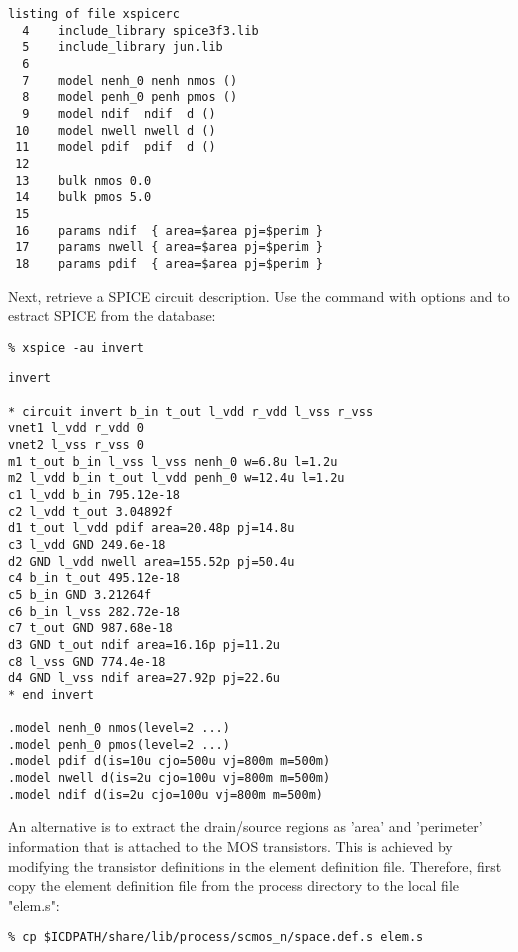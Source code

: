 \small \begin{Verbatim}[frame=single]
listing of file xspicerc
  4    include_library spice3f3.lib
  5    include_library jun.lib
  6
  7    model nenh_0 nenh nmos ()
  8    model penh_0 penh pmos ()
  9    model ndif  ndif  d ()
 10    model nwell nwell d ()
 11    model pdif  pdif  d ()
 12
 13    bulk nmos 0.0
 14    bulk pmos 5.0
 15
 16    params ndif  { area=$area pj=$perim }
 17    params nwell { area=$area pj=$perim }
 18    params pdif  { area=$area pj=$perim }
\end{Verbatim}
\normalsize
Next, retrieve a SPICE circuit description.
Use the  command with options  and  to estract SPICE from the database:
\small
\begin{Verbatim}
% xspice -au invert
\end{Verbatim}
\normalsize
\small \begin{Verbatim}[frame=single]
invert

* circuit invert b_in t_out l_vdd r_vdd l_vss r_vss
vnet1 l_vdd r_vdd 0
vnet2 l_vss r_vss 0
m1 t_out b_in l_vss l_vss nenh_0 w=6.8u l=1.2u
m2 l_vdd b_in t_out l_vdd penh_0 w=12.4u l=1.2u
c1 l_vdd b_in 795.12e-18
c2 l_vdd t_out 3.04892f
d1 t_out l_vdd pdif area=20.48p pj=14.8u
c3 l_vdd GND 249.6e-18
d2 GND l_vdd nwell area=155.52p pj=50.4u
c4 b_in t_out 495.12e-18
c5 b_in GND 3.21264f
c6 b_in l_vss 282.72e-18
c7 t_out GND 987.68e-18
d3 GND t_out ndif area=16.16p pj=11.2u
c8 l_vss GND 774.4e-18
d4 GND l_vss ndif area=27.92p pj=22.6u
* end invert

.model nenh_0 nmos(level=2 ...)
.model penh_0 pmos(level=2 ...)
.model pdif d(is=10u cjo=500u vj=800m m=500m)
.model nwell d(is=2u cjo=100u vj=800m m=500m)
.model ndif d(is=2u cjo=100u vj=800m m=500m)
\end{Verbatim}
\normalsize
An alternative is to extract the drain/source regions as 'area' and 'perimeter'
information that is attached to the MOS transistors.
This is achieved by modifying the transistor definitions in the element definition file.
Therefore, first copy the element definition file from the process directory to the local file "elem.s":
\small
\begin{Verbatim}
% cp $ICDPATH/share/lib/process/scmos_n/space.def.s elem.s
\end{Verbatim}
\normalsize
